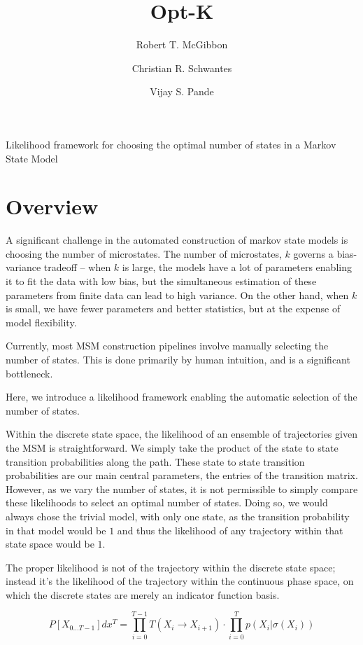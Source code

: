 \documentclass[twocolumn,floatfix,nofootinbib,aps]{revtex4-1}
\begin{document}
\title{Opt-K}
\author{Robert T. McGibbon}
\author{Christian R. Schwantes}
\author{Vijay S. Pande}
\maketitle


Likelihood framework for choosing the optimal number of states in a
Markov State Model

\section{Overview}

A significant challenge in the automated construction of markov state
models is choosing the number of microstates. The number of microstates,
$k$ governs a bias-variance tradeoff -- when $k$ is large, the models
have a lot of parameters enabling it to fit the data with low bias, but
the simultaneous estimation of these parameters from finite data can
lead to high variance. On the other hand, when $k$ is small, we have
fewer parameters and better statistics, but at the expense of model
flexibility.

Currently, most MSM construction pipelines involve manually selecting
the number of states. This is done primarily by human intuition, and is
a significant bottleneck.

Here, we introduce a likelihood framework enabling the automatic
selection of the number of states.

Within the discrete state space, the likelihood of an ensemble of
trajectories given the MSM is straightforward. We simply take the
product of the state to state transition probabilities along the path.
These state to state transition probabilities are our main central
parameters, the entries of the transition matrix. However, as we vary
the number of states, it is not permissible to simply compare these
likelihoods to select an optimal number of states. Doing so, we would
always chose the trivial model, with only one state, as the transition
probability in that model would be $1$ and thus the likelihood of any
trajectory within that state space would be $1$.

The proper likelihood is not of the trajectory within the discrete state
space; instead it's the likelihood of the trajectory within the
continuous phase space, on which the discrete states are merely an
indicator function basis. 

\begin{equation}
P[X_{0...T-1}] dx^T = \prod_{i=0}^{T-1} T(X_i \rightarrow X_{i+1}) \cdot \prod_{i=0}^{T} p(X_{i} | \sigma(X_{i}))
\label{eq:like}
\end{equation}
\end{document}
